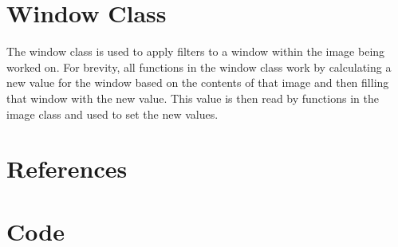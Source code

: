 \documentclass{article}
\begin{document}
\section{Window Class}
\label{sec:WindowClass}
The window class is used to apply filters to a window within the image being worked on. For brevity, all functions in the window class work by calculating a new value for the window based on the contents of that image and then filling that window with the new value. This value is then read by functions in the image class and used to set the new values.

\newpage

\appendix
\section{References}
\renewcommand\refname{}
{}

\nocite{*}
\section{Code}

\end{document}
